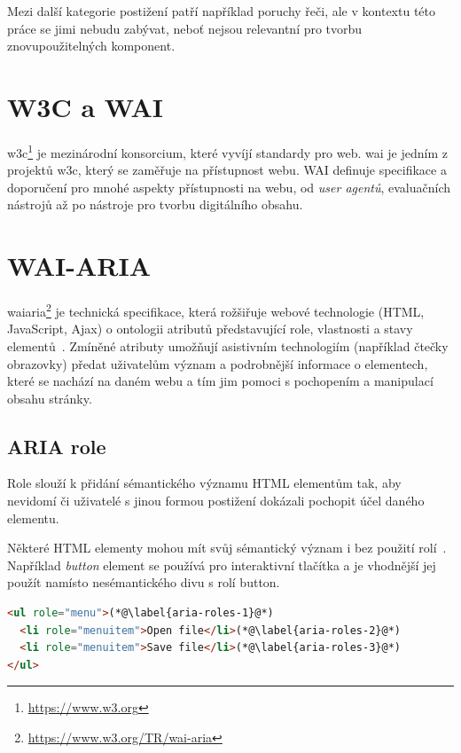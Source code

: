 Mezi další kategorie postižení patří například poruchy řeči, ale v kontextu této práce se jimi nebudu zabývat, neboť nejsou relevantní pro tvorbu znovupoužitelných komponent.

\section{W3C a WAI}


\gls{w3c}\footnote{\url{https://www.w3.org}} je mezinárodní konsorcium, které vyvíjí standardy pro web.
\gls{wai} je jedním z projektů \gls{w3c}, který se zaměřuje na přístupnost webu.
WAI definuje specifikace a doporučení pro mnohé aspekty přístupnosti na webu, od \textit{user agentů}, evaluačních nástrojů až po nástroje pro tvorbu digitálního obsahu.

\section{WAI-ARIA}

\gls{waiaria}\footnote{\url{https://www.w3.org/TR/wai-aria}} je technická specifikace, která rožšiřuje webové technologie (HTML, JavaScript, Ajax) o ontologii atributů představující role, vlastnosti a stavy elementů~\cite{wai-aria}.
Zmíněné atributy umožňují asistivním technologiím (například čtečky obrazovky) předat uživatelům význam a podrobnější informace o elementech, které se nachází na daném webu a tím jim pomoci s pochopením a manipulací obsahu stránky.

\subsection{ARIA role}

Role slouží k přidání sémantického významu HTML elementům tak, aby nevidomí či uživatelé s jinou formou postižení dokázali pochopit účel daného elementu.

Některé HTML elementy mohou mít svůj sémantický význam i bez použití rolí~\cite{wai-implicit-semantics}.
Například \textit{button} element se používá pro interaktivní tlačítka a je vhodnější jej použít namísto nesémantického divu s rolí button.

\clearpage

\begin{lstlisting}[caption={Aria role}, label={aria-roles}, language=html]
<ul role="menu">(*@\label{aria-roles-1}@*)
  <li role="menuitem">Open file</li>(*@\label{aria-roles-2}@*)
  <li role="menuitem">Save file</li>(*@\label{aria-roles-3}@*)
</ul>
\end{lstlisting}

